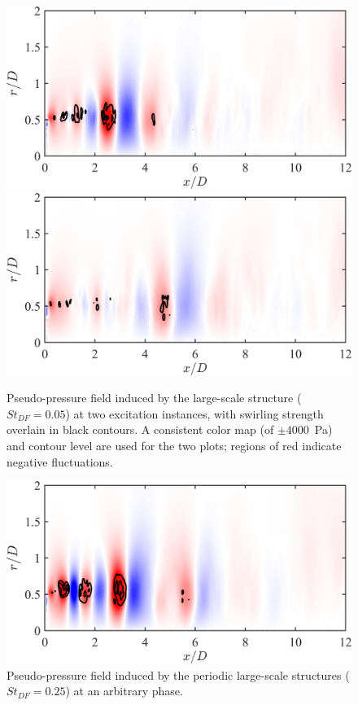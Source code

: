 \begin{figure}
	\centering
		\includegraphics[width=0.65\linewidth]{Figures/ch5_St005_PSL_101.png}\\
		\includegraphics[width=0.65\linewidth]{Figures/ch5_St005_PSL_161.png}
	\caption{Pseudo-pressure field induced by the large-scale structure ($St_{DF} = 0.05$) at two excitation instances, with swirling strength overlain in black contours. A consistent color map (of $\pm 4000$~Pa) and contour level are used for the two plots; regions of red indicate negative fluctuations.}
	\label{fig:PSL_St005}
\end{figure}
\begin{figure}
	\centering
	\includegraphics[width=0.65\linewidth]{Figures/ch5_St025_PSL_41.png}
	\caption{Pseudo-pressure field induced by the periodic large-scale structures ($St_{DF} = 0.25$) at an arbitrary phase.}
	\label{fig:PSL_St025}
\end{figure}


